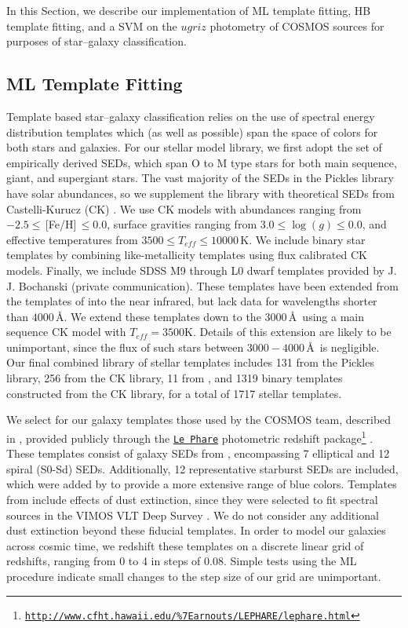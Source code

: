 \documentclass[12pt,preprint]{aastex}
\begin{document}
In this Section, we describe our implementation of ML template
fitting, HB template fitting, and a SVM on the $ugriz$ photometry of
COSMOS sources for purposes of star--galaxy classification.

\subsection{ML Template Fitting}
\label{ssec:MLspecifics}

Template based star--galaxy classification relies on the use of
spectral energy distribution templates which (as well as possible)
span the space of colors for both stars and galaxies.  For our stellar
model library, we first adopt the \citet{pickles98} set of empirically
derived SEDs, which span O to M type stars for both main sequence,
giant, and supergiant stars.  The vast majority of the SEDs in the
Pickles library have solar abundances, so we supplement the library
with theoretical SEDs from Castelli-Kurucz (CK) \citep{castelli04a}.
We use CK models with abundances ranging from $-2.5
\le\,$[Fe/H]$\,\le0.0$, surface gravities ranging from
$3.0\le\log(g)\le0.0$, and effective temperatures from $3500 \le
T_{eff} \le 10000\,$K.  We include binary star templates by combining
like-metallicity templates using flux calibrated CK models.  Finally, we include SDSS
M9 through L0 dwarf templates provided by J. J. Bochanski (private 
communication).  These
templates have been extended from the templates of \citet{bochanski07} into 
the near infrared, but lack data for wavelengths shorter than $4000\,$\AA.  We
extend these templates down to the $3000\,$\AA\, using a main sequence
CK model with $T_{eff}=3500$K.  Details of this extension are likely
to be unimportant, since the flux of such stars between
$3000-4000\,$\AA\, is negligible.  Our final combined library of stellar
templates includes 131 from the Pickles library, 256 from the CK library,
11 from \citet{bochanski07}, and 1319 binary templates constructed from
the CK library, for a total of 1717 stellar templates.

We select for our galaxy templates those used by the COSMOS team,
described in \citep{ilbert09}, provided publicly through the
\href{http://www.cfht.hawaii.edu/\%7Earnouts/LEPHARE/lephare.html}
{\texttt{Le Phare}} photometric redshift package\footnote{
\href{http://www.cfht.hawaii.edu/\%7Earnouts/LEPHARE/lephare.html}
{\tt http://www.cfht.hawaii.edu/\%7Earnouts/LEPHARE/lephare.html}}
\citep{arnouts99,ilbert06}.  These templates consist of galaxy SEDs
from \citet{polletta07}, encompassing 7 elliptical and 12 spiral
(S0-Sd) SEDs.  Additionally, 12 representative starburst SEDs are
included, which were added by \citet{ilbert09} to provide a more
extensive range of blue colors.  Templates from \citet{polletta07}
include effects of dust extinction, since they were selected to fit
spectral sources in the VIMOS VLT Deep Survey \citep{lefevre05}.  We
do not consider any additional dust extinction beyond these fiducial
templates.  In order to model our galaxies across cosmic time, we
redshift these templates on a discrete linear grid of redshifts,
ranging from 0 to 4 in steps of 0.08.  Simple tests using the ML
procedure indicate small changes to the step size of our grid are
unimportant. 
\end{document}
